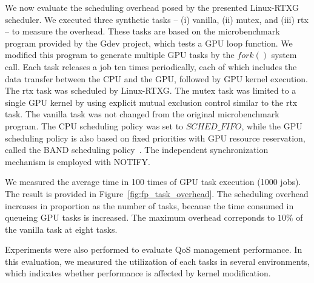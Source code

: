 We now evaluate the scheduling overhead posed by the presented
Linux-RTXG scheduler.
We executed three synthetic tasks -- (i) vanilla, (ii) mutex, and (iii)
rtx -- to measure the overhead. 
These tasks are based on the microbenchmark program provided by the Gdev
project, which tests a GPU loop function.
We modified this program to generate multiple GPU tasks by the $fork()$
system call.
Each task releases a job ten times periodically, each of which includes
the data transfer between the CPU and the GPU, followed by GPU kernel
execution.
The rtx task was scheduled by Linux-RTXG.
The mutex task was limited to a single GPU kernel by using explicit
mutual exclusion control similar to the rtx task.
The vanilla task was not changed from the original microbenchmark
program.
The CPU scheduling policy was set to $SCHED\_FIFO$, while the GPU
scheduling policy is also based on fixed priorities with GPU resource
reservation, called the BAND scheduling policy~\cite{kato:gdev}.
The independent synchronization mechanism is employed with NOTIFY.

We measured the average time in 100 times of GPU task execution (1000 jobs).
The result is provided in Figure~\ref{fig:fp_task_overhead}.
The scheduling overhead increases in proportion as the number of tasks,
because the time consumed in queueing GPU tasks is increased. 
The maximum overhead correponds to $10\%$ of the vanilla task at eight
tasks.

Experiments were also performed to evaluate QoS management performance.
In this evaluation, we measured the utilization of each tasks in several environments,
which indicates whether performance is affected by kernel modification.


